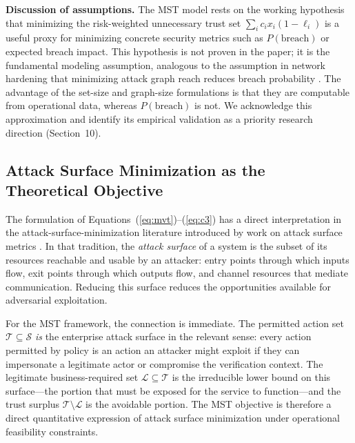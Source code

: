 \documentclass[unnumsec,webpdf,contemporary,large]{oup-authoring-template}
\theoremstyle{thmstyleone}
\theoremstyle{thmstyletwo}
\theoremstyle{thmstylethree}
\begin{document}
\begin{appendices}
\textbf{Discussion of assumptions.} The MST model rests on the working hypothesis
that minimizing the risk-weighted unnecessary trust set $\sum_i c_i x_i (1 - \ell_i)$
is a useful proxy for minimizing concrete security metrics such as $P(\text{breach})$
or expected breach impact. This hypothesis is not proven in the paper; it is the
fundamental modeling assumption, analogous to the assumption in network hardening
that minimizing attack graph reach reduces breach probability \cite{shandilya2014}.
The advantage of the set-size and graph-size formulations is that they are
computable from operational data, whereas $P(\text{breach})$ is not. We acknowledge
this approximation and identify its empirical validation as a priority research
direction (Section~10).



\subsection{Attack Surface Minimization as the Theoretical Objective}
\label{app:A7}

The formulation of Equations~(\ref{eq:mvt})--(\ref{eq:c3}) has a direct interpretation
in the attack-surface-minimization literature introduced by work on attack surface metrics \cite{howard2005,manadhata2011}. In that
tradition, the \textit{attack surface} of a system is the subset of its resources
reachable and usable by an attacker: entry points through which inputs flow, exit points
through which outputs flow, and channel resources that mediate communication. Reducing
this surface reduces the opportunities available for adversarial exploitation.

For the MST framework, the connection is immediate. The permitted action set
$\mathcal{T} \subseteq \mathcal{S}$ \emph{is} the enterprise attack surface in the
relevant sense: every action permitted by policy is an action an attacker might
exploit if they can impersonate a legitimate actor or compromise the verification
context. The legitimate business-required set $\mathcal{L} \subseteq \mathcal{T}$ is
the irreducible lower bound on this surface---the portion that must be exposed for
the service to function---and the trust surplus $\mathcal{T} \setminus \mathcal{L}$
is the avoidable portion. The MST objective is therefore a direct quantitative
expression of attack surface minimization under operational feasibility constraints.


\end{appendices}
\end{document}

